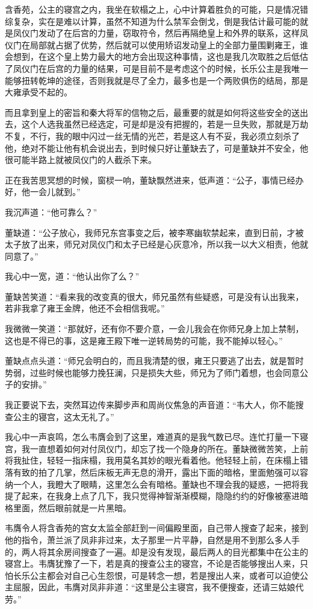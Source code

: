 含香苑，公主的寝宫之内，我坐在软榻之上，心中计算着胜负的可能，只是情况错综复杂，实在是难以计算，虽然不知道为什么禁军会倒戈，倒是我估计最可能的就是凤仪门发动了在后宫的力量，窃取符令，然后再隔绝皇上和外界的联系，这样凤仪门在局部就占据了优势，然后就可以使用矫诏发动皇上的全部力量围剿雍王，谁会想到，在这个皇上势力最大的地方会出现这种事情，这也是我几次取胜之后低估了凤仪门在后宫的力量的结果，可是目前不是考虑这个的时候，长乐公主是我唯一能够扭转乾坤的途径，否则我就是尽了全力，最多也是一个两败俱伤的结局，那是大雍承受不起的。

而且拿到皇上的密旨和秦大将军的信物之后，最重要的就是如何将这些安全的送出去，这个人选我虽然已经选定，可是却是没有把握的，若是一旦失败，那就是万劫不复，不行，我的眼中闪过一丝无情的光芒，若是这人有不妥，我必须立刻杀了他，绝对不能让他有机会说出去，到时候只好让董缺去了，可是董缺并不安全，他很可能半路上就被凤仪门的人截杀下来。

正在我苦思冥想的时候，窗棂一响，董缺飘然进来，低声道：“公子，事情已经办好，他一会儿就到。”

我沉声道：“他可靠么？”

董缺道：“公子放心，我师兄东宫事变之后，被李寒幽软禁起来，直到日前，才被太子放了出来，师兄对凤仪门和太子已经是心灰意冷，所以我一以大义相责，他就同意了。”

我心中一宽，道：“他认出你了么？”

董缺苦笑道：“看来我的改变真的很大，师兄虽然有些疑惑，可是没有认出我来，若非我拿了雍王金牌，他还不会相信我呢。”

我微微一笑道：“那就好，还有你不要介意，一会儿我会在你师兄身上加上禁制，这也是不得已的事，这是雍王殿下唯一逆转局势的可能，我不能掉以轻心。”

董缺点点头道：“师兄会明白的，而且我清楚的很，雍王只要逃了出去，就是暂时势弱，过些时候也能够力挽狂澜，只是损失大些，师兄为了师门着想，也会同意公子的安排。”

我正要说下去，突然耳边传来脚步声和周尚仪焦急的声音道：“韦大人，你不能搜查公主的寝宫，这太无礼了。”

我心中一声哀鸣，怎么韦膺会到了这里，难道真的是我气数已尽。连忙打量一下寝宫，我一直想着如何对付凤仪门，却忘了找一个隐身的所在。董缺微微苦笑，上前将我扯住，轻轻一指床榻，我用莫名其妙的眼光看着他。他轻轻上前，在床榻上错落有致的拍了几掌，然后床板无声无息的滑开，露出下面的暗格，里面勉强可以容纳一个人，我瞪大了眼睛，这里怎么会有暗格。董缺也不理会我的疑惑，一把将我提了起来，在我身上点了几下，我只觉得神智渐渐模糊，隐隐约约的好像被塞进暗格里面，然后眼前就是一片黑暗。

韦膺令人将含香苑的宫女太监全部赶到一间偏殿里面，自己带人搜查了起来，接到他的指令，萧兰派了凤非非过来，太子那里一片平静，自然是用不到那么多人手的，两人将其余房间搜查了一遍。却是没有发现，最后两人的目光都集中在公主的寝宫上。韦膺犹豫了一下，若是真的搜查公主的寝宫，不论是否能够搜出人来，只怕长乐公主都会对自己心生怨恨，可是转念一想，若是搜出人来，或者可以迫使公主屈服，因此，韦膺对凤非非道：“这里是公主寝宫，我不便搜查，还请三姑娘代劳。”

